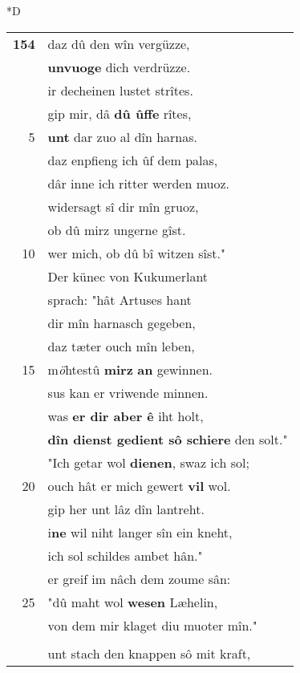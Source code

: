 \documentclass[8pt,a4paper,notitlepage]{article}
\begin{document}
\begin{table}[ht]
\begin{minipage}[t]{0.5\linewidth}
\small
\begin{center}*D
\end{center}
\begin{tabular}{rl}
\textbf{154} & daz dû den wîn vergüzze,\\ 
 & \textbf{unvuoge} dich verdrüzze.\\ 
 & ir decheinen lustet strîtes.\\ 
 & gip mir, dâ \textbf{dû ûffe} rîtes,\\ 
5 & \textbf{unt} dar zuo al dîn harnas.\\ 
 & daz enpfieng ich ûf dem palas,\\ 
 & dâr inne ich ritter werden muoz.\\ 
 & widersagt sî dir mîn gruoz,\\ 
 & ob dû mirz ungerne gîst.\\ 
10 & wer mich, ob dû bî witzen sîst."\\ 
 & Der künec von Kukumerlant\\ 
 & sprach: "hât Artuses hant\\ 
 & dir mîn harnasch gegeben,\\ 
 & daz tæter ouch mîn leben,\\ 
15 & m\textit{ö}htestû \textbf{mirz} \textbf{an} gewinnen.\\ 
 & sus kan er vriwende minnen.\\ 
 & was \textbf{er dir aber ê} iht holt,\\ 
 & \textbf{dîn dienst gedient sô schiere} den solt."\\ 
 & "Ich getar wol \textbf{dienen}, swaz ich sol;\\ 
20 & ouch hât er mich gewert \textbf{vil} wol.\\ 
 & gip her unt lâz dîn lantreht.\\ 
 & i\textbf{ne} wil niht langer sîn ein kneht,\\ 
 & ich sol schildes ambet hân."\\ 
 & er greif im nâch dem zoume sân:\\ 
25 & "dû maht wol \textbf{wesen} Læhelin,\\ 
 & von dem mir klaget diu muoter mîn."\\ 
 & \textit{\begin{large}D\end{large}}er rîter umbe kêrt den schaft\\ 
 & unt stach den knappen sô mit kraft,\\ 

\end{tabular}
\end{minipage}
\end{table}
\end{document}
